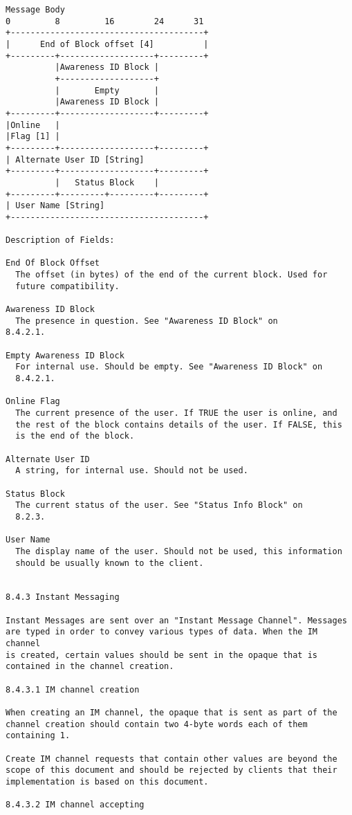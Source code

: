 \documentclass[titlepage,oneside]{book}
\begin{document}
\begin{verbatim}
Message Body
0         8         16        24      31
+---------------------------------------+
|      End of Block offset [4]          |
+---------+-------------------+---------+
          |Awareness ID Block |
          +-------------------+
          |       Empty       |
          |Awareness ID Block |
+---------+-------------------+---------+
|Online   |
|Flag [1] |
+---------+-------------------+---------+
| Alternate User ID [String]
+---------+-------------------+---------+
          |   Status Block    |
+---------+---------+---------+---------+
| User Name [String]
+---------------------------------------+

Description of Fields:

End Of Block Offset
  The offset (in bytes) of the end of the current block. Used for
  future compatibility.

Awareness ID Block
  The presence in question. See "Awareness ID Block" on
8.4.2.1.

Empty Awareness ID Block
  For internal use. Should be empty. See "Awareness ID Block" on
  8.4.2.1.

Online Flag
  The current presence of the user. If TRUE the user is online, and
  the rest of the block contains details of the user. If FALSE, this
  is the end of the block.

Alternate User ID
  A string, for internal use. Should not be used.

Status Block
  The current status of the user. See "Status Info Block" on
  8.2.3.

User Name
  The display name of the user. Should not be used, this information
  should be usually known to the client.


8.4.3 Instant Messaging

Instant Messages are sent over an "Instant Message Channel". Messages
are typed in order to convey various types of data. When the IM channel
is created, certain values should be sent in the opaque that is
contained in the channel creation.

8.4.3.1 IM channel creation

When creating an IM channel, the opaque that is sent as part of the 
channel creation should contain two 4-byte words each of them 
containing 1.

Create IM channel requests that contain other values are beyond the
scope of this document and should be rejected by clients that their
implementation is based on this document.

8.4.3.2 IM channel accepting


\end{verbatim}
\end{document}
